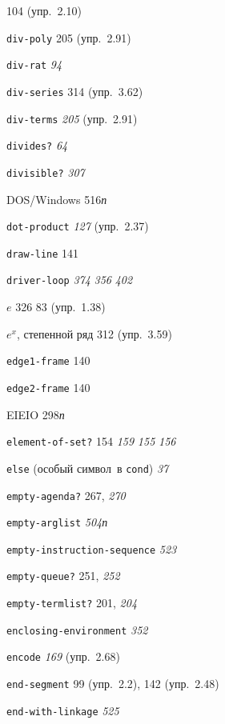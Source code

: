 \begin{theindex}
   104 (упр.~2.10)
\item {\texttt{div-poly}} 205 (упр.~2.91)
\item {\texttt{div-rat}} {\it 94}
\item {\texttt{div-series}} 314 (упр.~3.62)
\item {\texttt{div-terms}} {\it 205} (упр.~2.91)
\item {\texttt{divides?}} {\it 64}
\item {\texttt{divisible?}} {\it 307}
\item {DOS/Windows} 516{\it п}
\item {\texttt{dot-product}} {\it 127} (упр.~2.37)
\item {\texttt{draw-line}} 141
\item {\texttt{driver-loop}}
   {\it 374}
   {\it 356}
   {\it 402}
\bigskip
\item {$e$}
   326
   83 (упр.~1.38)
\item {$e^x$, степенной ряд} 312 (упр.~3.59)
\item {\texttt{edge1-frame}} 140
\item {\texttt{edge2-frame}} 140
\item {EIEIO} 298{\it п}
\item {\texttt{element-of-set?}} 154
   {\it 159}
   {\it 155}
   {\it 156}
\item {\texttt{else} (особый символ~в \texttt{cond})} {\it 37}
\item {\texttt{empty-agenda?}} 267, {\it 270}
\item {\texttt{empty-arglist}} {\it 504}{\it п}
\item {\texttt{empty-instruction-sequence}} {\it 523}
\item {\texttt{empty-queue?}} 251, {\it 252}
\item {\texttt{empty-termlist?}} 201, {\it 204}
\item {\texttt{enclosing-environment}} {\it 352}
\item {\texttt{encode}} {\it 169} (упр.~2.68)
\item {\texttt{end-segment}} 99 (упр.~2.2), 142 (упр.~2.48)
\item {\texttt{end-with-linkage}} {\it 525}

\end{theindex}
